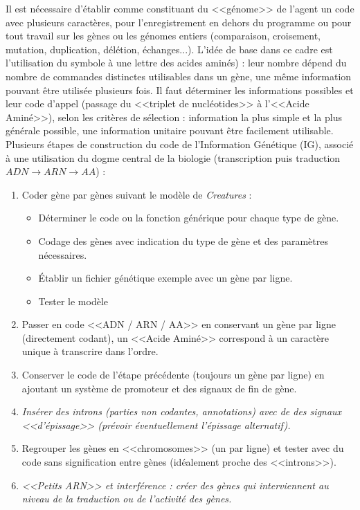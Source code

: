 \documentclass[11pt,twoside,a4paper]{article}
\begin{document}
Il est n{\'e}cessaire d'{\'e}tablir comme constituant du <<g{\'e}nome>> de l'agent un code avec plusieurs caract{\`e}res, pour l'enregistrement en dehors du programme ou pour tout travail sur les g{\`e}nes ou les g{\'e}nomes entiers (comparaison, croisement, mutation, duplication, d{\'e}l{\'e}tion, {\'e}changes...).  L'id{\'e}e de base dans ce cadre est l'utilisation du symbole {\`a} une lettre des acides amin{\'e}s) : leur nombre d{\'e}pend du nombre de commandes distinctes utilisables dans un g{\`e}ne, une m{\^e}me information pouvant {\^e}tre utilis{\'e}e plusieurs fois. Il faut d{\'e}terminer les informations possibles et leur code d'appel (passage du <<triplet de nucl{\'e}otides>> {\`a} l'<<Acide Amin{\'e}>>), selon les crit{\`e}res de s{\'e}lection : information la plus simple et la plus g{\'e}n{\'e}rale possible, une information unitaire pouvant {\^e}tre facilement utilisable.~\\

Plusieurs {\'e}tapes de construction du code de l'Information G{\'e}n{\'e}tique (IG), associ{\'e} {\`a} une utilisation du dogme central de la biologie (transcription puis traduction $ADN \rightarrow ARN \rightarrow AA$) : 
\begin{enumerate}
	\item Coder g{\`e}ne par g{\`e}nes suivant le mod{\`e}le de \emph{Creatures} : 
	\begin{itemize}
		\item D{\'e}terminer le code ou la fonction g{\'e}n{\'e}rique pour chaque type de g{\`e}ne. 
		\item Codage des g{\`e}nes avec indication du type de g{\`e}ne et des param{\`e}tres n{\'e}cessaires. 
		\item {\'E}tablir un fichier g{\'e}n{\'e}tique exemple avec un g{\`e}ne par ligne. 
		\item Tester le mod{\`e}le
	\end{itemize}
	\item Passer en code <<ADN / ARN / AA>> en conservant un g{\`e}ne par ligne (directement codant), un <<Acide Amin{\'e}>> correspond {\`a} un caract{\`e}re unique {\`a} transcrire dans l'ordre.  
	\item Conserver le code de l'{\'e}tape pr{\'e}c{\'e}dente (toujours un g{\`e}ne par ligne) en ajoutant un syst{\`e}me de promoteur et des signaux de fin de g{\`e}ne. 
	\item \textit{Ins{\'e}rer des introns (parties non codantes, annotations) avec de des signaux <<d'{\'e}pissage>> (pr{\'e}voir {\'e}ventuellement l'{\'e}pissage alternatif). }
	\item Regrouper les g{\`e}nes en <<chromosomes>> (un par ligne) et tester avec du code sans signification entre g{\`e}nes (id{\'e}alement proche des <<introns>>). 
	\item \textit{<<Petits ARN>> et interf{\'e}rence : cr{\'e}er des g{\`e}nes qui interviennent au niveau de la traduction ou de l'activit{\'e} des g{\`e}nes. }
\end{enumerate}~\\
\end{document}
